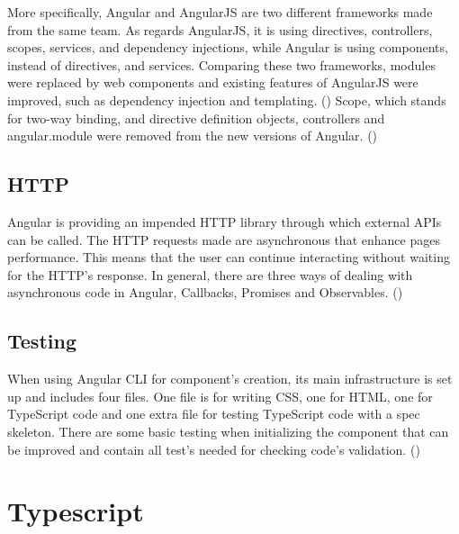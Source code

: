 More specifically, Angular and AngularJS are two different frameworks made from the same team. As regards AngularJS, it is using directives, controllers, scopes, services, and dependency injections, while Angular is using components, instead of directives, and services. Comparing these two frameworks, modules were replaced by web components and existing features of AngularJS were improved, such as dependency injection and templating. (\cite{angularUpandRunning}) Scope, which stands for two-way binding, and directive definition objects, controllers and angular.module were removed from the new versions of Angular. (\cite{murray2018ng}) \par

\subsection{HTTP}

Angular is providing an impended HTTP library through which external APIs can be called. The HTTP requests made are asynchronous that enhance pages performance. This means that the user can continue interacting without waiting for the HTTP's response. In general, there are three ways of dealing with asynchronous code in Angular, Callbacks, Promises and Observables. (\cite{murray2018ng})

\subsection{Testing}

When using Angular CLI for component's creation, its main infrastructure is set up and includes four files. One file is for writing CSS, one for HTML, one for TypeScript code and one extra file for testing TypeScript code with a spec skeleton. There are some basic testing when initializing the component that can be improved and contain all test's needed for checking code's validation. (\cite{angularUpandRunning}) \par

\section{Typescript}

